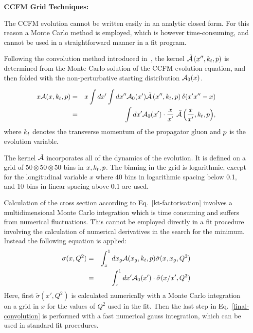 \begin{description}
\vspace{0.1cm}
\item \bf {CCFM Grid Techniques:} \rm

The CCFM evolution cannot be written easily in an analytic closed form. For this 
reason a Monte Carlo method is employed, which is however time-consuming, and 
cannot be used in a straightforward manner in a fit program. 

Following the  convolution method introduced in~\cite{Jung:2012hy,Hautmann:2013tba}, the 
kernel $ \tilde {\cal A}\left(x'',\kt,\Pmax\right) $ is determined from the Monte Carlo  solution of the CCFM evolution equation, 
and then folded with the non-perturbative starting distribution ${\cal A}_0 (x)$.

{\small{ 
\begin{eqnarray}
x {\cal A}(x,\kt,\Pmax) &= &x\int dx' \int dx'' {\cal A}_0 (x') \tilde{\cal A}\left(x'',\kt,\Pmax\right) 
 \delta(x' 
x'' - x) 
\nonumber  
\\
& = & \int dx' {{\cal A}_0 (x') }  
\cdot \frac{x}{x'} \ { \tilde{\cal A}\left(\frac{x}{x'},\kt,\Pmax\right) }, 
\end{eqnarray}
}}
where $k_t$ denotes the transverse momentum of the propagator gluon and $p$ is the 
evolution variable.

The kernel $\tilde{\cal A}$ incorporates all of  the dynamics of the evolution.  
It is defined on a grid of $50\otimes50\otimes50$ bins in $ x, k_t, p$.  
The binning in the grid is logarithmic, except for the longitudinal variable 
$x$ where 40 bins in logarithmic 
spacing below 0.1, and 10 bins in linear spacing above 0.1 are used.

Calculation of the cross section according to Eq.~\ref{kt-factorisation} involves a 
multidimensional Monte Carlo integration which is time consuming and suffers from numerical fluctuations.  
This cannot be employed directly in a fit procedure involving the calculation of numerical derivatives 
in the search for the minimum. Instead the following equation is applied:
\begin{eqnarray}
\sigma(x,Q^2) & = & \int_x^1 d x_g {\cal A}(x_g,\kt,\Pmax) \hat{ \sigma}(x,x_g,Q^2) 
\nonumber\\
  & = & \int_x^1 dx' {\cal A}_0 (x') \cdot \tilde{ \sigma}(x/x',Q^2) \label{final-convolution}
 \end{eqnarray}
Here, first $ \tilde{ \sigma}(x',Q^2)$ is calculated numerically with a Monte Carlo integration 
on a grid in $x$ for the values of $Q^2$ used in the fit. Then the last step in Eq.~\ref{final-convolution}  
is performed with a fast numerical gauss integration, which can be used in standard fit procedures.


\end{description}
